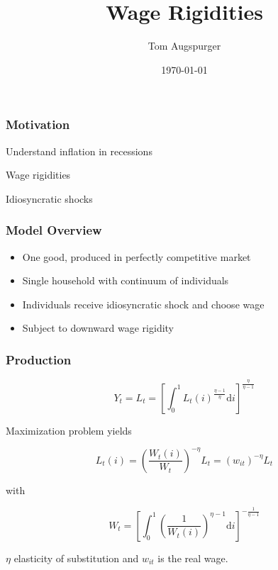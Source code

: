 \documentclass{beamer}
\title{Wage Rigidities}
\author{Tom Augspurger}
\date{\today}
\begin{document}
\frame{\titlepage}


\begin{frame}[t]\frametitle{Motivation}

    Understand inflation in recessions

    Wage rigidities

    Idiosyncratic shocks

\end{frame}





\begin{frame}[t]\frametitle{Model Overview}

\begin{itemize}
    \item One good, produced in perfectly competitive market
    \item Single household with continuum of individuals
    \item Individuals receive idiosyncratic shock and choose wage
    \item Subject to downward wage rigidity
\end{itemize}

\end{frame}

    \begin{frame}[t]\frametitle{Production}

    \begin{equation*} \label{eq:agg_labor}
        Y_t = L_t = \left[ \int_0^1 L_t(i)^{\frac{\eta - 1}{\eta}} \mathup{d}i \right]^{\frac{\eta}{\eta - 1}}
    \end{equation*}

    Maximization problem yields

    \begin{equation*}
        \label{eq:labor_demand}
        L_t(i) = \left( \frac{W_t(i)}{W_t} \right)^{-\eta}L_t = (w_{it})^{-\eta}L_t
    \end{equation*}

    with

    \begin{equation*} \label{eq:wage_index}
        W_t = \left[\int_{0}^{1}\left(\frac{1}{W_t(i)}\right)^{\eta - 1} \mathup{d}i \right]^{-\frac{1}{\eta - 1}}
    \end{equation*}

    $\eta$ elasticity of substitution and $w_{it}$ is the real wage.

\end{frame}
\end{document}
